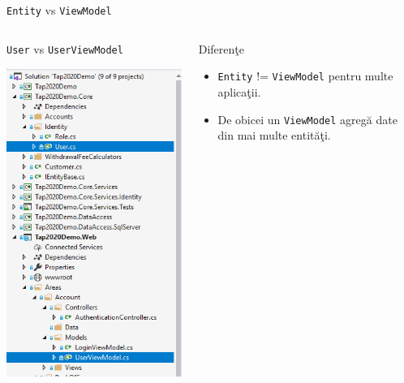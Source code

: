 \documentclass[presentation]{beamer}
\begin{document}
\begin{frame}[label={sec:orgfd00b2b},fragile]{\texttt{Entity} vs \texttt{ViewModel}}
 \begin{columns}
\begin{column}{0.4\columnwidth}
\begin{block}{\texttt{User} vs \texttt{UserViewModel}}
\begin{center}
\includegraphics[height=.8\textheight]{img/entity-vs-view-model.png}
\end{center}
\end{block}
\end{column}
\begin{column}{0.6\columnwidth}
\begin{block}{Diferenţe}
\begin{itemize}
\item \texttt{Entity} != \texttt{ViewModel} pentru multe aplicaţii.
\item De obicei un \texttt{ViewModel} agregă date din mai multe entităţi.
\end{itemize}
\end{block}
\end{column}
\end{columns}
\end{frame}
\end{document}
